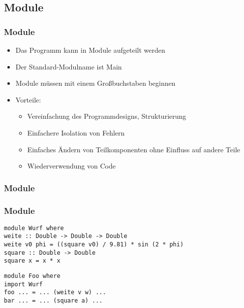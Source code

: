 \documentclass[fleqn,11pt,aspectratio=43]{beamer}
\begin{document}
\subsection{Module}
\begin{frame}
\frametitle{Module}
\begin{block}{\vspace*{-3ex}}
\begin{itemize}
  \item Das Programm kann in Module aufgeteilt werden
  \item Der Standard-Modulname ist Main
  \item Module müssen mit einem Großbuchstaben beginnen
  \item Vorteile: 
    \begin{itemize}
      \item Vereinfachung des Programmdesigns, Strukturierung
      \item Einfachere Isolation von Fehlern
      \item Einfaches Ändern von Teilkomponenten ohne Einfluss auf andere Teile
      \item Wiederverwendung von Code
    \end{itemize}
\end{itemize}
\end{block}
\end{frame}

\begin{frame}[fragile]
\frametitle{Module}
\begin{block}{\vspace*{-3ex}}
\begin{center}
\scalebox{1}{}
\end{center}
\end{block} 
\end{frame}

\begin{frame}[fragile]
\frametitle{Module} 
\begin{lstlisting}
module Wurf where
weite :: Double -> Double -> Double
weite v0 phi = ((square v0) / 9.81) * sin (2 * phi)
square :: Double -> Double
square x = x * x
\end{lstlisting}
\begin{lstlisting}
module Foo where
import Wurf
foo ... = ... (weite v w) ...
bar ... = ... (square a) ...
\end{lstlisting}
\end{frame}
\end{document}
